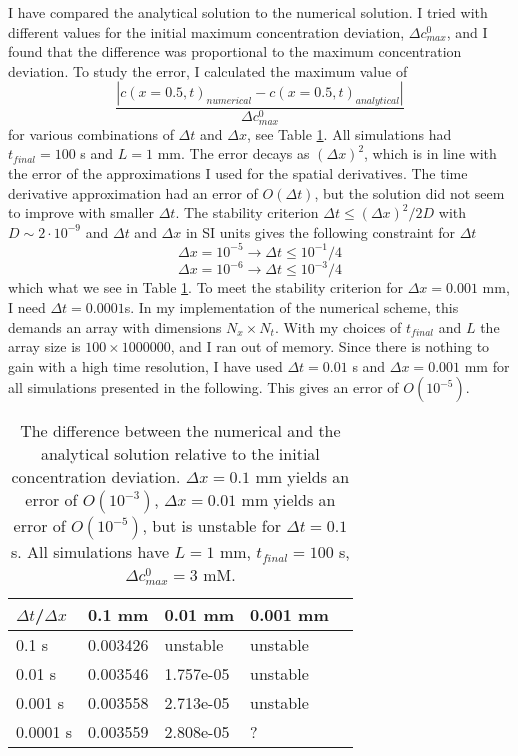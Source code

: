 \documentclass{article}
\begin{document}
I have compared the analytical solution to the numerical solution. I tried with different values for the initial maximum concentration deviation, $\Delta c^0_{max}$, and I found that the difference was proportional to the maximum concentration deviation. To study the error, I calculated the maximum value of
\begin{equation}
\frac{|c(x=0.5,t)_{numerical}-c(x=0.5,t)_{analytical}|}{\Delta c^0_{max}}
\end{equation}
for various combinations of $\Delta t$ and $\Delta x$, see Table \ref{tab:error}. All simulations had $t_{final} = 100$ s and $L=1$ mm. The error decays as $(\Delta x)^2$, which is in line with the error of the  approximations I used for the spatial derivatives. The time derivative approximation had an error of $O(\Delta t)$, but the solution did not seem to improve with smaller $\Delta t$. The stability criterion $\Delta t \leq (\Delta x)^2/2D$ with $D \sim 2\cdot 10^{-9}$ and $\Delta t $ and $\Delta x$ in SI units gives the following constraint for $\Delta t$
$$\Delta x= 10^{-5} \rightarrow \Delta t \leq 10^{-1}/4$$
$$\Delta x= 10^{-6} \rightarrow \Delta t \leq 10^{-3}/4$$ 
which what we see in Table \ref{tab:error}. To meet the stability criterion for $\Delta x = 0.001$ mm, I need $\Delta t = 0.0001$s. In my implementation of the numerical scheme, this demands an array with dimensions $N_x \times N_t$. With my choices of $t_{final}$ and $L$ the array size is  $100\times 1000 000$, and I ran out of memory.
Since there is nothing to gain with a high time resolution, I have used $\Delta t = 0.01$ s and $\Delta x = 0.001$ mm for all simulations presented in the following. This gives an error of $O(10^{-5})$. 
\begin{table}[h!]
  \centering
  \caption{The difference between the numerical and the analytical solution relative to the initial concentration deviation. $\Delta x =0.1$ mm yields an error of $O(10^{-3})$, $\Delta x =0.01$ mm yields an error of $O(10^{-5})$, but is unstable for $\Delta t = 0.1$ s. All simulations have $L=1$ mm, $t_ {final} =100$ s, $\Delta c^0_{max} =3$ mM.}
  \label{tab:error}
  \begin{tabular}{l||l|l|l|l}
$\Delta t$/$\Delta x$ & 0.1 mm & 0.01 mm & 0.001 mm  \\
\hline
0.1 s & 0.003426 &  unstable & unstable \\
0.01 s & 0.003546 & 1.757e-05  & unstable \\
0.001 s & 0.003558 & 2.713e-05 & unstable \\
0.0001 s & 0.003559& 2.808e-05 & ? \\

 \end{tabular}
\end{table}
\end{document}
